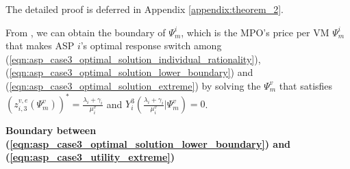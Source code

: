 \documentclass[10pt,journal, compsoc]{IEEEtran}
\begin{document}
The detailed proof is deferred in Appendix \ref{appendix:theorem_2}.

From , we can obtain the boundary of $\Psi_m^i$, which is the MPO's price per VM $\Psi_m^i$ that makes ASP $i$'s optimal response switch among (\ref{eqn:asp_case3_optimal_solution_individual_rationality}), (\ref{eqn:asp_case3_optimal_solution_lower_boundary}) and (\ref{eqn:asp_case3_optimal_solution_extreme}) by solving the $\Psi_m^v$ that satisfies $(z_{i,3}^{v,e}(\Psi_m^v))^* = \frac{\lambda_i+\gamma_i}{\mu_i^v}$ and $Y_i^3(\frac{\lambda_i+\gamma_i}{\mu_i^v}|\Psi_m^v) = 0$.

\textbf{Boundary between (\ref{eqn:asp_case3_optimal_solution_lower_boundary}) and (\ref{eqn:asp_case3_utility_extreme})}
\end{document}

